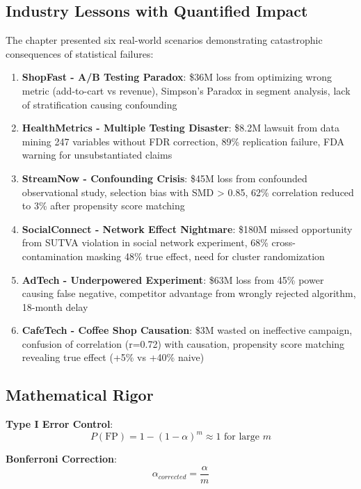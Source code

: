 \subsection{Industry Lessons with Quantified Impact}

The chapter presented six real-world scenarios demonstrating catastrophic consequences of statistical failures:

\begin{enumerate}
    \item \textbf{ShopFast - A/B Testing Paradox}: \$36M loss from optimizing wrong metric (add-to-cart vs revenue), Simpson's Paradox in segment analysis, lack of stratification causing confounding

    \item \textbf{HealthMetrics - Multiple Testing Disaster}: \$8.2M lawsuit from data mining 247 variables without FDR correction, 89\% replication failure, FDA warning for unsubstantiated claims

    \item \textbf{StreamNow - Confounding Crisis}: \$45M loss from confounded observational study, selection bias with SMD > 0.85, 62\% correlation reduced to 3\% after propensity score matching

    \item \textbf{SocialConnect - Network Effect Nightmare}: \$180M missed opportunity from SUTVA violation in social network experiment, 68\% cross-contamination masking 48\% true effect, need for cluster randomization

    \item \textbf{AdTech - Underpowered Experiment}: \$63M loss from 45\% power causing false negative, competitor advantage from wrongly rejected algorithm, 18-month delay

    \item \textbf{CafeTech - Coffee Shop Causation}: \$3M wasted on ineffective campaign, confusion of correlation (r=0.72) with causation, propensity score matching revealing true effect (+5\% vs +40\% naive)
\end{enumerate}

\subsection{Mathematical Rigor}

\textbf{Type I Error Control}:
\[
P(\text{FP}) = 1 - (1 - \alpha)^m \approx 1 \text{ for large } m
\]

\textbf{Bonferroni Correction}:
\[
\alpha_{corrected} = \frac{\alpha}{m}
\]

